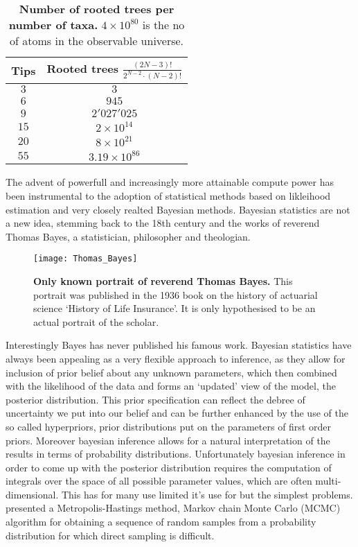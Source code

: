 \begin{table}[H]
\centering
\begin{tabular}{cc}
\hline 
Tips & Rooted trees $\frac{(2N-3)!}{2^{N-2}\cdot(N-2)!}$ \tabularnewline
\hline 
\rowcolor{gray1}
$3$ & $3$\tabularnewline
$6$ & $945$\tabularnewline
\rowcolor{gray1}
$9$ & $2'027'025$\tabularnewline
$15$ & $2\times10^{14}$\tabularnewline
\rowcolor{gray1}
$20$ & $8\times10^{21}$\tabularnewline
$55$ & $3.19\times10^{86}$\tabularnewline
\end{tabular}
\caption{
{ \footnotesize 
{\bf{Number of rooted trees per number of taxa.}} $4 \times 10^{80} $ is the no of atoms in the observable universe.
}%
}
\label{tab:maxLikeBurden}
\end{table}

The advent of powerfull and increasingly more attainable compute power has been instrumental to the adoption of statistical methods based on likleihood estimation and very closely realted Bayesian methods.
Bayesian statistics are not a new idea, stemming back to the 18th century and the works of reverend Thomas Bayes, a statistician, philosopher and theologian. 

\begin{figure}[H]
\centering
\texttt{[image: Thomas\_Bayes]} 
\caption{
{ \footnotesize 
{\bf Only known portrait of reverend Thomas Bayes.} This portrait was published in the 1936 book on the history of actuarial science `History of Life Insurance'. It is only hypothesised to be an actual portrait of the scholar.
}%
}
\label{fig:bayes}
\end{figure}

Interestingly Bayes has never published his famous work.
Bayesian statistics have always been appealing as a very flexible approach to inference, as they allow for inclusion of prior belief about any unknown parameters, which then combined with the likelihood of the data and forms an `updated' view of the model, the posterior distribution.
This prior specification can reflect the debree of uncertainty we put into our belief and can be further enhanced by the use of the so called hyperpriors, prior distributions put on the parameters of first order priors.
Moreover bayesian inference allows for a natural interpretation of the results in terms of probability distributions. %
Unfortunately bayesian inference in order to come up with the posterior distribution requires the computation of integrals over the space of all possible parameter values, which are often multi-dimensional.
This has for many use limited it's use for but the simplest problems.
\cite{Metropolis1953} presented a Metropolis-Hastings method, Markov chain Monte Carlo (MCMC) algorithm for obtaining a sequence of random samples from a probability distribution for which direct sampling is difficult.

